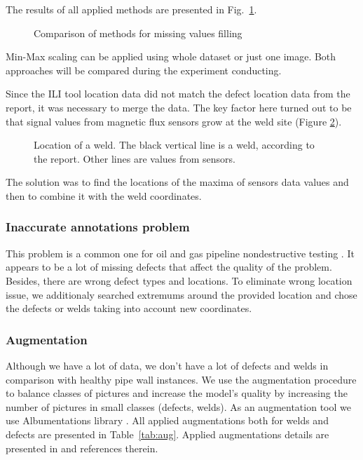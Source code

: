 The results of all applied methods are presented in Fig.~\ref{ris:filling_example}.
\begin{figure}[ht]
	\caption{Comparison of methods for missing values filling}
	\label{ris:filling_example}
\end{figure}

Min-Max scaling can be applied using whole dataset or just one image.
Both approaches will be compared during the experiment conducting.

Since the ILI tool location data did not match the defect location data from the report, it was necessary to merge the data. The key factor here turned out to be that signal values from magnetic flux sensors grow at the weld site (Figure \ref{ris:prepr}). 

\begin{figure}[!h]
	\caption{Location of a weld. The black vertical line is a weld, according to the report. Other lines are values from sensors.}
	\label{ris:prepr}
\end{figure}
The solution was to find the locations of the maxima of sensors data values and then to combine it with the weld coordinates.

\subsubsection{Inaccurate annotations problem}
This problem is a common one for oil and gas pipeline nondestructive testing \cite{Khodayari-Rostamabad2009}.
It appears to be a lot of missing defects that affect the quality of the problem.
Besides, there are wrong defect types and locations.
To eliminate wrong location issue, we additionaly searched extremums around the provided location and chose the defects or welds taking into account new coordinates.

\subsubsection{Augmentation}
Although we have a lot of data, we don't have a lot of defects and welds in comparison with healthy pipe wall instances.
We use the augmentation procedure to balance classes of pictures and increase the model's quality by increasing the number of pictures in small classes (defects, welds).
As an augmentation tool we use Albumentations library \cite{buslaev2020albumentations}.
All applied augmentations both for welds and defects are presented in Table~\ref{tab:aug}.
Applied augmentations details are presented in \cite{buslaev2020albumentations} and references therein.

